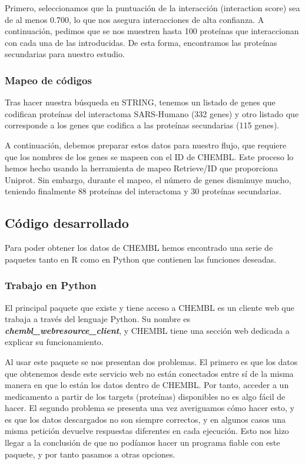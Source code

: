 Primero, seleccionamos que la puntuación de la interacción (interaction score) sea de al menos 0.700, lo que nos asegura interacciones de alta confianza. A continuación, pedimos que se nos muestren hasta 100 proteínas que interaccionan con cada una de las introducidas. De esta forma, encontramos las proteínas secundarias para nuestro estudio. 

    \subsubsection{Mapeo de códigos}
    Tras hacer nuestra búsqueda en STRING, tenemos un listado de genes que codifican proteínas del interactoma SARS-Humano (332 genes) y otro listado que corresponde a los genes que codifica a las proteínas secundarias (115 genes).
    
    A continuación, debemos preparar estos datos para nuestro flujo, que requiere que los nombres de los genes se mapeen con el ID de CHEMBL. Este proceso lo hemos hecho usando la herramienta de mapeo Retrieve/ID que proporciona Uniprot. Sin embargo, durante el mapeo, el número de genes disminuye mucho, teniendo finalmente 88 proteínas del interactoma y 30 proteínas secundarias.

\subsection{Código desarrollado}

Para poder obtener los datos de CHEMBL hemos encontrado una serie de paquetes tanto en R como en Python que contienen las funciones deseadas.

\subsubsection{Trabajo en Python}
El principal paquete que existe y tiene acceso a CHEMBL es un cliente web que trabaja a través del lenguaje Python. Su nombre es \textbf{\textit{chembl\_webresource\_client}}, y CHEMBL tiene una sección web dedicada a explicar su funcionamiento. %

Al usar este paquete se nos presentan dos problemas. El primero es que los datos que obtenemos desde este servicio web no están conectados entre sí de la misma manera en que lo están los datos dentro de CHEMBL. Por tanto, acceder a un medicamento a partir de los targets (proteínas) disponibles no es algo fácil de hacer. El segundo problema se presenta una vez averiguamos cómo hacer esto, y es que los datos descargados no son siempre correctos, y en algunos casos una misma petición devuelve respuestas diferentes en cada ejecución. Esto nos hizo llegar a la conclusión de que no podíamos hacer un programa fiable con este paquete, y por tanto pasamos a otras opciones.

